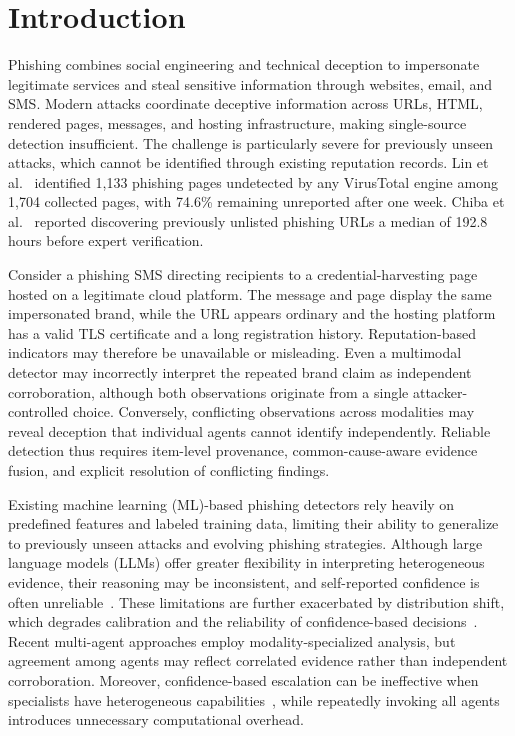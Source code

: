 
\section{Introduction}

Phishing combines social engineering and technical deception
to impersonate legitimate services and steal sensitive
information through websites, email, and SMS. Modern attacks
coordinate deceptive information across URLs, HTML, rendered
pages, messages, and hosting infrastructure, making
single-source detection insufficient. The challenge is
particularly severe for previously unseen attacks, which
cannot be identified through existing reputation records.
Lin et al.~\cite{lin2021phishpedia} identified 1,133 phishing
pages undetected by any VirusTotal engine among 1,704
collected pages, with 74.6\% remaining unreported after
one week. Chiba et al.~\cite{chiba2026phishlumos} reported
discovering previously unlisted phishing URLs a median
of 192.8 hours before expert verification.

Consider a phishing SMS directing recipients to a
credential-harvesting page hosted on a legitimate cloud
platform. The message and page display the same
impersonated brand, while the URL appears ordinary and
the hosting platform has a valid TLS certificate and a
long registration history. Reputation-based indicators
may therefore be unavailable or misleading. Even a
multimodal detector may incorrectly interpret the
repeated brand claim as independent corroboration,
although both observations originate from a single
attacker-controlled choice. Conversely, conflicting
observations across modalities may reveal deception
that individual agents cannot identify independently.
Reliable detection thus requires item-level provenance,
common-cause-aware evidence fusion, and explicit
resolution of conflicting findings.

Existing machine learning (ML)-based phishing detectors
rely heavily on predefined features and labeled training
data, limiting their ability to generalize to previously
unseen attacks and evolving phishing strategies.
Although large language models (LLMs) offer greater
flexibility in interpreting heterogeneous evidence,
their reasoning may be inconsistent, and self-reported
confidence is often unreliable~\cite{xiong2024can}.
These limitations are further exacerbated by
distribution shift, which degrades calibration and
the reliability of confidence-based
decisions~\cite{ovadia2019can}. Recent multi-agent
approaches employ modality-specialized analysis,
but agreement among agents may reflect correlated
evidence rather than independent corroboration.
Moreover, confidence-based escalation can be
ineffective when specialists have heterogeneous
capabilities~\cite{jitkrittum2023when}, while
repeatedly invoking all agents introduces
unnecessary computational overhead.

